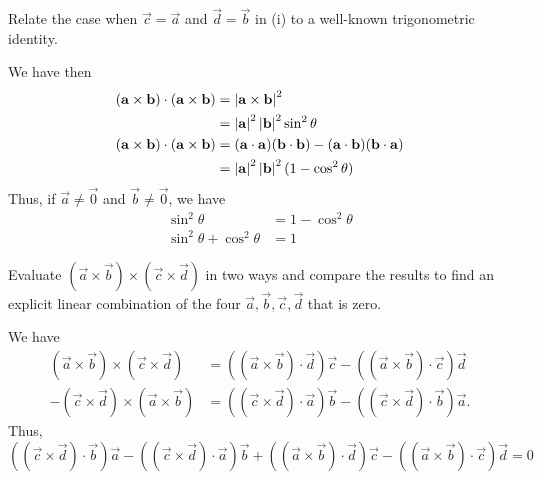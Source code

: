 \documentclass[12pt]{article}
\begin{document}
    \begin{subquestion}
        Relate the case when $\vec{c}=\vec{a}$ and $\vec{d}=\vec{b}$ in (i)
        to a well-known trigonometric identity.
    \end{subquestion}
    \begin{answer}
        We have then 
        \begin{align*}
            (\mathbf{a}\times\mathbf{b})\cdot(\mathbf{a}\times\mathbf{b})
            &= \left\lvert \mathbf{a}\times\mathbf{b} \right\rvert^{2}\\
            &= \left\lvert \mathbf{a} \right\rvert^{2}\left\lvert \mathbf{b} \right\rvert^{2}\sin^{2}\theta\\
            (\mathbf{a}\times\mathbf{b})\cdot(\mathbf{a}\times\mathbf{b})
            &= (\mathbf{a}\cdot\mathbf{a})(\mathbf{b}\cdot\mathbf{b})
            - (\mathbf{a}\cdot\mathbf{b})(\mathbf{b}\cdot\mathbf{a})\\
            &= \left\lvert \mathbf{a} \right\rvert^{2}\left\lvert \mathbf{b} \right\rvert^{2}(1 - \cos^{2}\theta)
        \end{align*}
        Thus, if $\vec{a} \ne \vec{0}$ and $\vec{b} \ne \vec{0}$, we have
        \begin{align*}
            \sin^{2}\theta &= 1 - \cos^{2}\theta\\
            \sin^{2}\theta + \cos^{2}\theta &= 1
        \end{align*}
    \end{answer}

    \begin{subquestion}
        Evaluate $(\vec{a}\times\vec{b})\times(\vec{c}\times\vec{d})$
        in two ways and compare the results to find
        an explicit linear combination of the four $\vec{a},\vec{b},\vec{c},\vec{d}$ that is zero.
    \end{subquestion}
    \begin{answer}
        We have
        \begin{align*}
            (\vec{a}\times\vec{b})\times(\vec{c}\times\vec{d})
            &= ((\vec{a}\times\vec{b})\cdot\vec{d})\vec{c}
            - ((\vec{a}\times\vec{b})\cdot\vec{c})\vec{d}\\
            -(\vec{c}\times\vec{d})\times(\vec{a}\times\vec{b})
            &= ((\vec{c}\times\vec{d})\cdot\vec{a})\vec{b}
            - ((\vec{c}\times\vec{d})\cdot\vec{b})\vec{a}.
        \end{align*}
        Thus,
        \[
            ((\vec{c}\times\vec{d})\cdot\vec{b})\vec{a}
            - ((\vec{c}\times\vec{d})\cdot\vec{a})\vec{b}
            + ((\vec{a}\times\vec{b})\cdot\vec{d})\vec{c}
            - ((\vec{a}\times\vec{b})\cdot\vec{c})\vec{d} = 0
        \]
    \end{answer}
\end{document}
